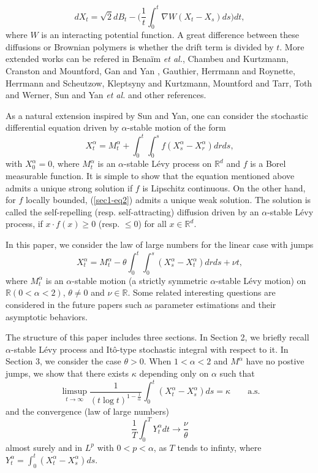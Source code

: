\documentclass[11pt]{amsart}
\theoremstyle{plain}
\numberwithin{equation}{section}
\begin{document}
$$
dX_t = \sqrt{2}dB_t - \bigg(\frac{1}{t}\int_0^t \nabla W(X_t - X_s)ds\bigg)dt,
$$
where $W$ is an interacting potential function. A great difference between these diffusions or Brownian polymers is whether the drift term is divided by $t$. More extended works can be refered in Bena\"{i}m \emph{et al.}\cite{Benaim}, Chambeu and Kurtzmann\cite{Chambeu}, Cranston and Mountford\cite{Cranston2}, Gan and Yan \cite{Gan}, Gauthier\cite{Gauthier}, Herrmann and Roynette\cite{Herrmann}, Herrmann and Scheutzow\cite{Herrmann2}, Kleptsyny and Kurtzmann\cite{Kleptsyny}, Mountford and Tarr\cite{Mountford}, Toth and Werner\cite{Werner}, Sun and Yan \emph{et al.}\cite{Yan,Yan2} and other references.

As a natural extension inspired by Sun and Yan\cite{Yan2}, one can consider the stochastic diﬀerential equation driven by $\alpha$-stable motion of the form
\begin{equation}\label{sec1-eq2}
X_t^\alpha = M_t^\alpha + \int_0^t\int_0^s f(X_s^\alpha - X_r^\alpha) dr ds,
\end{equation}
with $X_0^\alpha = 0$, where $M_t^\alpha$ is an $\alpha$-stable L\'{e}vy process on $\mathbb{R}^d$ and $f$ is a Borel measurable function. It is simple to show that the equation mentioned above admits a unique strong solution if $f$ is Lipschitz continuous. On the other hand, for $f$ locally bounded, (\ref{sec1-eq2}) admits a unique weak solution. The solution is called the self-repelling (resp. self-attracting) diffusion driven by an $\alpha$-stable L\'{e}vy process, if $x \cdot f(x) \geq 0$ (resp. $\leq 0$) for all $x \in \mathbb{R}^d$.

In this paper, we consider the law of large numbers for the linear case with jumps
\begin{equation}\label{sec1-eq3}
X_t^\alpha = M_t^\alpha -\theta \int_0^t \int_0^s (X_s^\alpha -X_t^\alpha)drds+\nu t,
\end{equation}
where $M_t^\alpha$ is an $\alpha$-stable motion (a strictly symmetric $\alpha$-stable L\'{e}vy motion) on $\mathbb{R} (0<\alpha<2)$, $\theta \neq 0$ and $\nu \in \mathbb{R}$. Some related interesting questions are considered in the future papers such as parameter estimations and their asymptotic behaviors. 

The structure of this paper includes three sections. In Section 2, we briefly recall $\alpha$-stable L\'{e}vy process and It\^{o}-type stochastic integral with respect to it. In Section 3, we consider the case $\theta>0$. When $1<\alpha<2$ and $M^\alpha$ have no postive jumps, we show that there exists $\kappa$ depending only on $\alpha$ such that
$$
\limsup_{t\rightarrow \infty}\frac{1}{(t\log t)^{1-\frac{1}{\alpha}}}\int_0^t \left(X_t^\alpha-X_s^\alpha\right)ds=\kappa\qquad \text{a.s.}
$$
and the convergence (law of large numbers)
$$
\frac{1}{T}\int_0^T Y_t^\alpha dt\longrightarrow\frac{\nu}{\theta}
$$
almost surely and in $L^p$ with $0<p<\alpha$, as $T$ tends to infinty, where $Y^\alpha_t=\int_0^t(X_t^\alpha-X_s^\alpha)ds$.
\end{document}
